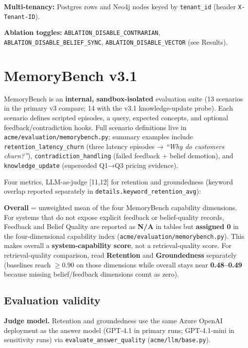 \documentclass[11pt,a4paper]{article}
\begin{document}
\textbf{Multi-tenancy:} Postgres rows and Neo4j nodes keyed by
\texttt{tenant\_id} (header \texttt{X-Tenant-ID}).

\textbf{Ablation toggles:} \texttt{ABLATION\_DISABLE\_CONTRARIAN},
\texttt{ABLATION\_DISABLE\_BELIEF\_SYNC},
\texttt{ABLATION\_DISABLE\_VECTOR} (see Results).

\section{MemoryBench v3.1}\label{memorybench-v3.1}

MemoryBench is an \textbf{internal, sandbox-isolated} evaluation suite
(13 scenarios in the primary v3 compare; 14 with the v3.1
knowledge-update probe). Each scenario defines scripted episodes, a
query, expected concepts, and optional feedback/contradiction hooks.
Full scenario definitions live in
\texttt{acme/evaluation/memorybench.py}; summary examples include
\texttt{retention\_latency\_churn} (three latency episodes → \emph{``Why
do customers churn?''}), \texttt{contradiction\_handling} (failed
feedback + belief demotion), and \texttt{knowledge\_update} (superseded
Q1→Q3 pricing evidence).

Four metrics, LLM-as-judge {[}11,12{]} for retention and groundedness
(keyword overlap reported separately in
\texttt{details.keyword\_retention\_avg}):

\acmeTableMetrics

\textbf{Overall} = unweighted mean of the four MemoryBench capability
dimensions. For systems that do not expose explicit feedback or
belief-quality records, Feedback and Belief Quality are reported as
\textbf{N/A} in tables but \textbf{assigned 0} in the four-dimensional
capability index (\texttt{acme/evaluation/memorybench.py}). This makes
overall a \textbf{system-capability score}, not a retrieval-quality
score. For retrieval-quality comparison, read \textbf{Retention} and
\textbf{Groundedness} separately (baselines reach \(\geq 0.90\) on those
dimensions while overall stays near \textbf{0.48--0.49} because missing
belief/feedback dimensions count as zero).

\subsection{Evaluation validity}\label{evaluation-validity}

\textbf{Judge model.} Retention and groundedness use the same Azure
OpenAI deployment as the answer model (GPT-4.1 in primary runs;
GPT-4.1-mini in sensitivity runs) via \texttt{evaluate\_answer\_quality}
(\texttt{acme/llm/base.py}).
\end{document}
